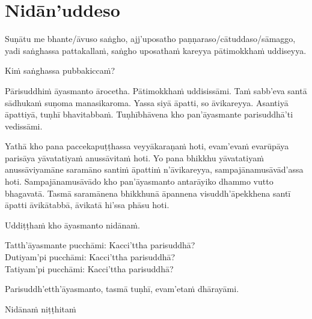 
\section{Nidān'uddeso}
\label{nidan'uddeso}

Suṇātu me bhante/āvuso saṅgho, ajj'uposatho paṇṇaraso/cātuddaso/sāmaggo, yadi saṅghassa pattakallaṁ, saṅgho uposathaṁ kareyya pātimokkhaṁ uddiseyya.

Kiṁ saṅghassa pubbakiccaṁ?

Pārisuddhiṁ āyasmanto ārocetha. Pātimokkhaṁ uddisissāmi. Taṁ sabb'eva santā sādhukaṁ suṇoma manasikaroma. Yassa siyā āpatti, so āvikareyya. Asantiyā āpattiyā, tuṇhī bhavitabbaṁ. Tuṇhībhāvena kho pan'āyasmante parisuddhā'ti vedissāmi.

Yathā kho pana paccekapuṭṭhassa veyyākaraṇaṁ hoti, evam'evaṁ evarūpāya parisāya yāvatatiyaṁ anussāvitaṁ hoti. Yo pana bhikkhu yāvatatiyaṁ anussāviyamāne saramāno santiṁ āpattiṁ n'āvikareyya, sampajānamusāvād'assa hoti. Sampajānamusāvādo kho pan'āyasmanto antarāyiko dhammo vutto bhagavatā. Tasmā saramānena bhikkhunā āpannena visuddh'āpekkhena santī āpatti āvikātabbā, āvikatā hi'ssa phāsu hoti.

\begin{center}
	Uddiṭṭhaṁ kho āyasmanto nidānaṁ.\makeatletter\hyperlink{endnote8-appendix}\makeatother

	\smallskip

	Tatth'āyasmante pucchāmi: Kacci'ttha parisuddhā?\\
	Dutiyam'pi pucchāmi: Kacci'ttha parisuddhā?\\
	Tatiyam'pi pucchāmi: Kacci'ttha parisuddhā?

	\smallskip

	Parisuddh'etth'āyasmanto, tasmā tuṇhī, evam'etaṁ dhārayāmi.
\end{center}

\begin{outro}
	Nidānaṁ niṭṭhitaṁ\makeatletter\hyperlink{endnote9-appendix}\makeatother
\end{outro}

\clearpage

